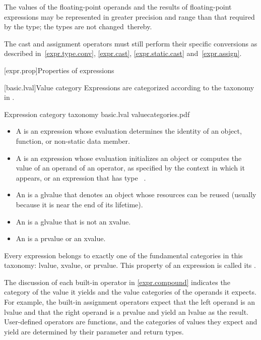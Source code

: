 \pnum
The values of the floating-point operands and
the results of floating-point expressions
may be represented in greater precision and range than that
required by the type; the types are not changed\
thereby.
\begin{footnote}
The cast and assignment operators must still perform their specific
conversions as described in~\ref{expr.type.conv}, \ref{expr.cast},
\ref{expr.static.cast} and~\ref{expr.assign}.
\end{footnote}

[expr.prop]{Properties of expressions}

[basic.lval]{Value category}
\pnum
Expressions are categorized according to the taxonomy in .

\begin{importgraphic}
{Expression category taxonomy}
{basic.lval}
{valuecategories.pdf}
\end{importgraphic}

\begin{itemize}
\item A  is an expression whose evaluation determines the identity of an object, function, or non-static data member.
\item A \defn{prvalue} is an expression whose evaluation initializes an object
or computes the value of an operand of an operator,
as specified by the context in which it appears,
or an expression that has type \cv{}~.
\item An  is a glvalue that denotes an object whose resources can be reused (usually because it is near the end of its lifetime).
\item An \defn{lvalue} is a glvalue that is not an xvalue.
\item An  is a prvalue or an xvalue.
\end{itemize}

\pnum
Every expression belongs to exactly one of the fundamental categories in this
taxonomy: lvalue, xvalue, or prvalue. This property of an expression is called
its \defn{value category}.
\begin{note}
The discussion of each built-in operator in
\ref{expr.compound} indicates the category of the value it yields and the value categories
of the operands it expects. For example, the built-in assignment operators expect that
the left operand is an lvalue and that the right operand is a prvalue and yield an
lvalue as the result. User-defined operators are functions, and the categories of
values they expect and yield are determined by their parameter and return types.
\end{note}

